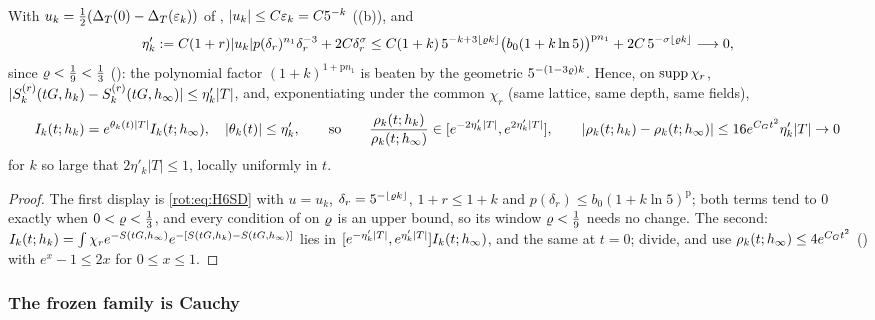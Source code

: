 \begin{lemma}\label{rot:lem:H6rate}
With $u_k=\frac12(\Delta_T(0)-\Delta_T(\varepsilon_k))$ of , $|u_k|\le C\varepsilon_k=C5^{-k}$ ((b)), and
\[
\eta'_k:= C(1+r)|u_k|p(\delta_r)^{n_1}\delta_r^{-3}+2C\delta_r^\sigma\le C(1+k)\,5^{-k+3\lfloor\varrho k\rfloor}\big(b_0(1+k\ln5)\big)^{\mathrm pn_1}+2C\,5^{-\sigma\lfloor\varrho k\rfloor}\longrightarrow0,
\]
since $\varrho<\frac19<\frac13$ (): the polynomial factor $(1+k)^{1+\mathrm pn_1}$ is beaten by the geometric $5^{-(1-3\varrho)k}$. Hence, on $\operatorname{supp}\chi_r$, $|S^{(r)}_k(tG,h_k)-S^{(r)}_k(tG,h_\infty)|\le\eta'_k|T|$, and, exponentiating under the common $\chi_r$ (same lattice, same depth, same fields),
\[
I_k(t;h_k)=e^{\theta_k(t)|T|}I_k(t;h_\infty),\quad|\theta_k(t)|\le\eta'_k,\qquad\text{so}\qquad
\frac{\rho_k(t;h_k)}{\rho_k(t;h_\infty)}\in[e^{-2\eta'_k|T|},e^{2\eta'_k|T|}],\qquad
|\rho_k(t;h_k)-\rho_k(t;h_\infty)|\le16e^{C_Gt^2}\eta'_k|T|\to0
\]
for $k$ so large that $2\eta'_k|T|\le1$, locally uniformly in $t$.
\end{lemma}
\begin{proof}
The first display is \eqref{rot:eq:H6SD} with $u=u_k$, $\delta_r=5^{-\lfloor\varrho k\rfloor}$, $1+r\le1+k$ and $p(\delta_r)\le b_0(1+k\ln5)^{\mathrm p}$; both terms tend to $0$ exactly when $0<\varrho<\frac13$, and every condition of  on $\varrho$ is an upper bound, so its window $\varrho<\frac19$ needs no change. The second: $I_k(t;h_k)=\int\chi_re^{-S(tG,h_\infty)}e^{-[S(tG,h_k)-S(tG,h_\infty)]}$ lies in $[e^{-\eta'_k|T|},e^{\eta'_k|T|}]I_k(t;h_\infty)$, and the same at $t=0$; divide, and use $\rho_k(t;h_\infty)\le4e^{C_Gt^2}$ () with $e^{x}-1\le2x$ for $0\le x\le1$.
\end{proof}

\subsubsection*{The frozen family is Cauchy}

